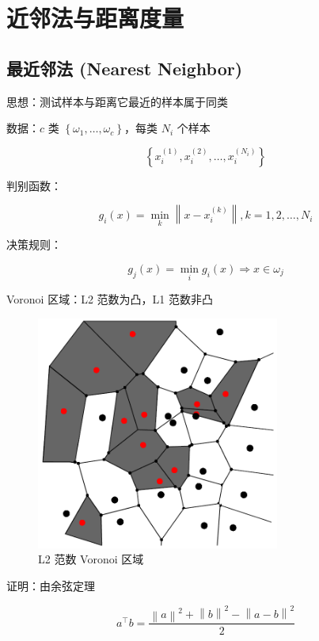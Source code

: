 \documentclass[openany,a4paper,12pt]{ctexbook}
\theoremstyle{kaiti}
\theoremstyle{normal}
\begin{document}
\chapter{近邻法与距离度量}

\section{最近邻法 (Nearest Neighbor) }

思想：测试样本与距离它最近的样本属于同类

数据：$c$ 类 $\left\{ \omega_1,\dots ,\omega_c \right\}$，每类 $N_i$ 个样本

\begin{equation}
\left\{ x_{i}^{\left(1 \right)},x_{i}^{\left(2 \right)},\dots ,x_{i}^{\left(N_i \right)} \right\}
\end{equation}

判别函数：

\begin{equation}
g_i(x)=\min_k\left\| x-x_{i}^{\left(k \right)} \right\| , k=1,2,\dots ,N_i
\end{equation}

决策规则：

\begin{equation}
g_j(x)=\min_ig_i(x)\Rightarrow x\in \omega_j
\end{equation}

Voronoi 区域：L2 范数为凸，L1 范数非凸

\begin{figure}
  \centering
  \includegraphics[width=8cm]{1627808452244-6.1-1.png}
  \caption{L2 范数 Voronoi 区域}
\end{figure}

证明：由余弦定理

\begin{equation}
a^{\top}b=\frac{\left\| a \right\|^2+\left\| b \right\|^2-\left\| a-b \right\|^2}{2}
\end{equation}
\end{document}
